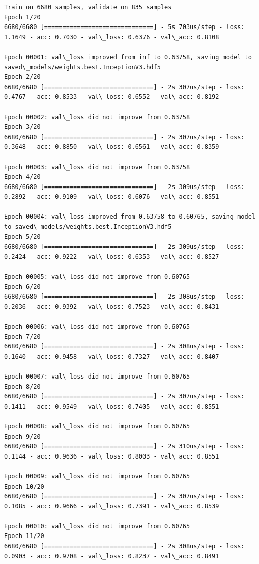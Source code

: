 \documentclass[11pt]{article}
\begin{document}
    \begin{Verbatim}[commandchars=\\\{\}]
Train on 6680 samples, validate on 835 samples
Epoch 1/20
6680/6680 [==============================] - 5s 703us/step - loss: 1.1649 - acc: 0.7030 - val\_loss: 0.6376 - val\_acc: 0.8108

Epoch 00001: val\_loss improved from inf to 0.63758, saving model to saved\_models/weights.best.InceptionV3.hdf5
Epoch 2/20
6680/6680 [==============================] - 2s 307us/step - loss: 0.4767 - acc: 0.8533 - val\_loss: 0.6552 - val\_acc: 0.8192

Epoch 00002: val\_loss did not improve from 0.63758
Epoch 3/20
6680/6680 [==============================] - 2s 307us/step - loss: 0.3648 - acc: 0.8850 - val\_loss: 0.6561 - val\_acc: 0.8359

Epoch 00003: val\_loss did not improve from 0.63758
Epoch 4/20
6680/6680 [==============================] - 2s 309us/step - loss: 0.2892 - acc: 0.9109 - val\_loss: 0.6076 - val\_acc: 0.8551

Epoch 00004: val\_loss improved from 0.63758 to 0.60765, saving model to saved\_models/weights.best.InceptionV3.hdf5
Epoch 5/20
6680/6680 [==============================] - 2s 309us/step - loss: 0.2424 - acc: 0.9222 - val\_loss: 0.6353 - val\_acc: 0.8527

Epoch 00005: val\_loss did not improve from 0.60765
Epoch 6/20
6680/6680 [==============================] - 2s 308us/step - loss: 0.2036 - acc: 0.9392 - val\_loss: 0.7523 - val\_acc: 0.8431

Epoch 00006: val\_loss did not improve from 0.60765
Epoch 7/20
6680/6680 [==============================] - 2s 308us/step - loss: 0.1640 - acc: 0.9458 - val\_loss: 0.7327 - val\_acc: 0.8407

Epoch 00007: val\_loss did not improve from 0.60765
Epoch 8/20
6680/6680 [==============================] - 2s 307us/step - loss: 0.1411 - acc: 0.9549 - val\_loss: 0.7405 - val\_acc: 0.8551

Epoch 00008: val\_loss did not improve from 0.60765
Epoch 9/20
6680/6680 [==============================] - 2s 310us/step - loss: 0.1144 - acc: 0.9636 - val\_loss: 0.8003 - val\_acc: 0.8551

Epoch 00009: val\_loss did not improve from 0.60765
Epoch 10/20
6680/6680 [==============================] - 2s 307us/step - loss: 0.1085 - acc: 0.9666 - val\_loss: 0.7391 - val\_acc: 0.8539

Epoch 00010: val\_loss did not improve from 0.60765
Epoch 11/20
6680/6680 [==============================] - 2s 308us/step - loss: 0.0903 - acc: 0.9708 - val\_loss: 0.8237 - val\_acc: 0.8491


\end{Verbatim}
\end{document}
